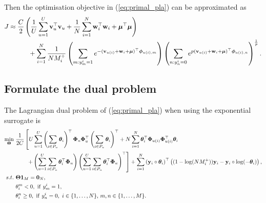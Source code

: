 Then the optimisation objective in (\ref{eq:primal_pla}) can be approximated as
\begin{equation*}
\begin{aligned}
J 
&\approx 
\frac{C}{2} \left( \frac{1}{U} \sum_{u=1}^U \mathbf{v}_u^\top \mathbf{v}_u + \frac{1}{N} \sum_{i=1}^N \mathbf{w}_i^\top \mathbf{w}_i + \bm{\mu}^\top \bm{\mu} \right) \\
& \hspace{3em}
  + \sum_{i=1}^N \frac{1}{N M_i^+} 
    \left( \sum_{m: y_m^i = 1} e^{-(\mathbf{v}_{u(i)} + \mathbf{w}_i + \bm{\mu})^\top \bm{\phi}_{u(i),m}} \right)
    \left( \sum_{n: y_n^i = 0} e^{p (\mathbf{v}_{u(i)} + \mathbf{w}_i + \bm{\mu})^\top \bm{\phi}_{u(i),n}} \right)^\frac{1}{p}.
\end{aligned}
\end{equation*}


\subsection{Formulate the dual problem}
The Lagrangian dual problem of (\ref{eq:primal_pla}) when using the exponential surrogate is
\begin{equation}
\label{eq:dual_pla}
\begin{aligned}
\min_{\Thetabm} \ & \frac{1}{2 C} \left[
     U \sum_{u=1}^U \left( \sum_{i \in P_u} \thetabm_i \right)^\top \Phibm_u \Phibm_u^\top \left( \sum_{i \in P_u} \thetabm_i \right)^\top
   + N \sum_{i=1}^N \thetabm_i^\top \Phibm_{u(i)} \Phibm_{u(i)}^\top \thetabm_i \right. \\
& \hspace{2em} \left.
   + \left( \sum_{u=1}^U \sum_{i \in P_u} \thetabm_i^\top \Phibm_u \right)
     \left( \sum_{u=1}^U \sum_{i \in P_u} \thetabm_i^\top \Phibm_u \right)^\top \right]
   + \sum_{i=1}^N \left( \y_i \circ \thetabm_i \right)^\top 
     \left( (1 - \log(N M_i^+)) \y_i - \y_i \circ \log(-\thetabm_i) \right), \\
s.t. \ 
& \Thetabm \one_M = \zero_N, \\
&\theta_i^m < 0, \ \mathrm{if} \ y_m^i = 1, \\
&\theta_i^n \ge 0, \ \mathrm{if} \ y_n^i = 0, \ i \in \{1,\dots,N\}, \, m,n \in \{1,\dots,M\}.
\end{aligned}
\end{equation}
